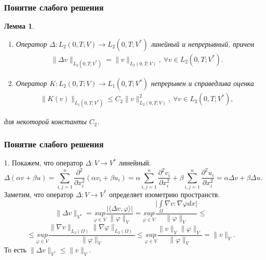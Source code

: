 \documentclass[10pt, pdf, hyperref={unicode}]{beamer}
\newtheorem{ru_lemma}{Лемма}
\renewenvironment{lemma}{\begin{ru_lemma}}{\end{ru_lemma}}
\begin{document}
  \begin{frame}
    \frametitle{Понятие слабого решения}
    \begin{center}
      \begin{minipage}[h]{0.97\linewidth}
      \begin{lemma} ~\\
    \begin{enumerate}
        \item Оператор $\Delta: L_2(0, T; V) \rightarrow L_2(0, T; V^\ast)$ линейный и\linebreak
        непрерывный, причем
        \begin{equation}\label{eq:5.9}
            \begin{gathered}
                \| \Delta v \|_{L_2(0, T; V^\ast)} = \| v \|_{L_2(0, T; V)}, \ \forall v \in L_2(0, T; V^\ast).
            \end{gathered}
        \end{equation}
        \item Оператор $K: L_2(0, T; V) \rightarrow L_1(0, T; V^\ast)$ непрерывен и справедлива оценка
        \begin{equation}\label{eq:5.10}
            \begin{gathered}
                \| K(v) \|_{L_1(0, T; V^\ast)} \leqslant C_2\| v \|^2_{L_2(0, T;V)}, \ \forall v \in L_2(0, T; V^\ast),
            \end{gathered}
        \end{equation}
    \end{enumerate}
    для некоторой константы $C_2$.
\end{lemma}
      \end{minipage}
    \end{center}
  \end{frame}

  \begin{frame}
    \frametitle{Понятие слабого решения}
    \begin{center}
      \begin{minipage}[h]{0.97\linewidth}
        1. Покажем, что оператор $\Delta : V\rightarrow V^*$ линейный. 
        $$\Delta (\alpha v+\beta u)= \sum_{i,j=1}^{n} \frac{\partial^2}{\partial x_i^2} (\alpha v_i+\beta u_i)=
        \alpha \sum_{i,j=1}^{n} \frac{\partial^2 v_i}{\partial x_i^2}+\beta \sum_{i,j=1}^{n} \frac{\partial^2 u_i}{\partial x_i^2}=\alpha\Delta v+\beta\Delta u.$$
        Заметим, что оператор $\Delta : V\rightarrow V^*$ определяет изометрию пространств.
        $$\| \Delta v \|_{V^*}=\underset{\varphi\in V}{sup} \frac{|\langle \Delta v,\varphi \rangle|}{\| \varphi\|_V}=\underset{\varphi\in V}{sup} 
        \frac{\bigg|\int\limits_{\Omega}\nabla v:\nabla\varphi dx\bigg|}{\| \varphi\|_V}\le$$
        $$\le\underset{\varphi\in V}{sup} \frac{\|\nabla v\|_{L_2(\Omega)}\|\nabla \varphi\|_{L_2(\Omega)}}{\|\varphi\|_V}
        \le\underset{\varphi\in V}{sup} \frac{\| v \|_{V} \| \varphi \|_{V}}{\| \varphi \|_{V}}=\| v \|_{V}.$$
        То есть $\| \Delta v \|_{V^*}\le\| v \|_{V}.$ 
      \end{minipage}
    \end{center}
  \end{frame}
\end{document}
